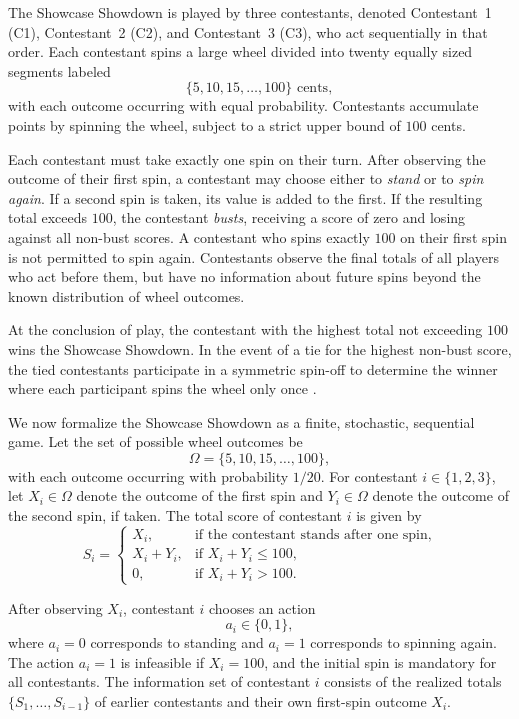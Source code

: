 \documentclass[titlepage,12pt]{article}
\begin{document}
The Showcase Showdown is played by three contestants, denoted Contestant~1 (C1), Contestant~2 (C2), and Contestant~3 (C3), who act sequentially in that order. Each contestant spins a large wheel divided into twenty equally sized segments labeled
\[
\{5, 10, 15, \dots, 100\} \text{ cents},
\]
with each outcome occurring with equal probability. Contestants accumulate points by spinning the wheel, subject to a strict upper bound of $100$ cents.

Each contestant must take exactly one spin on their turn. After observing the outcome of their first spin, a contestant may choose either to \emph{stand} or to \emph{spin again}. If a second spin is taken, its value is added to the first. If the resulting total exceeds $100$, the contestant \emph{busts}, receiving a score of zero and losing against all non-bust scores. A contestant who spins exactly $100$ on their first spin is not permitted to spin again. Contestants observe the final totals of all players who act before them, but have no information about future spins beyond the known distribution of wheel outcomes.

At the conclusion of play, the contestant with the highest total not exceeding $100$ wins the Showcase Showdown. In the event of a tie for the highest non-bust score, the tied contestants participate in a symmetric spin-off to determine the winner where each participant spins the wheel only once \cite{ShowcaseShowdownWiki}.

We now formalize the Showcase Showdown as a finite, stochastic, sequential game. Let the set of possible wheel outcomes be
\[
\Omega = \{5, 10, 15, \dots, 100\},
\]
with each outcome occurring with probability $1/20$. For contestant $i \in \{1,2,3\}$, let $X_i \in \Omega$ denote the outcome of the first spin and $Y_i \in \Omega$ denote the outcome of the second spin, if taken. The total score of contestant $i$ is given by
\[
S_i =
\begin{cases}
X_i, & \text{if the contestant stands after one spin}, \\
X_i + Y_i, & \text{if } X_i + Y_i \le 100, \\
0, & \text{if } X_i + Y_i > 100.
\end{cases}
\]

After observing $X_i$, contestant $i$ chooses an action
\[
a_i \in \{0,1\},
\]
where $a_i = 0$ corresponds to standing and $a_i = 1$ corresponds to spinning again. The action $a_i = 1$ is infeasible if $X_i = 100$, and the initial spin is mandatory for all contestants. The information set of contestant $i$ consists of the realized totals $\{S_1, \dots, S_{i-1}\}$ of earlier contestants and their own first-spin outcome $X_i$.
\end{document}
